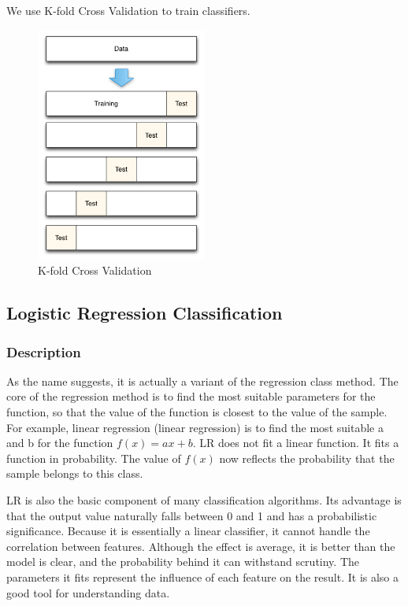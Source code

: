 \documentclass[11pt,en]{elegantpaper}
\begin{document}
We use K-fold Cross Validation to train classifiers.
\begin{figure}[H]
    \centering
    \includegraphics[width=0.5\textwidth]{figure/cross_validation_diagram.png}
    \caption{K-fold Cross Validation}
\end{figure}

\subsection{Logistic Regression Classification}
\subsubsection{Description}
As the name suggests, it is actually a variant of the regression class method. The core of the regression method is to find the most suitable parameters for the function, so that the value of the function is closest to the value of the sample. For example, linear regression (linear regression) is to find the most suitable a and b for the function $f (x) = ax + b$. LR does not fit a linear function. It fits a function in probability. The value of $f (x)$ now reflects the probability that the sample belongs to this class.

LR is also the basic component of many classification algorithms. Its advantage is that the output value naturally falls between 0 and 1 and has a probabilistic significance. Because it is essentially a linear classifier, it cannot handle the correlation between features. Although the effect is average, it is better than the model is clear, and the probability behind it can withstand scrutiny. The parameters it fits represent the influence of each feature on the result. It is also a good tool for understanding data.
\end{document}
